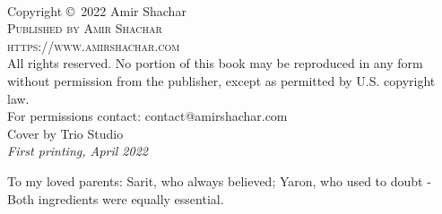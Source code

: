 \documentclass[11pt]{book}
\begin{document}

\begingroup
\thispagestyle{empty} %
\vfill
\endgroup


\newpage
~\vfill
\thispagestyle{empty}

\noindent Copyright \copyright\ 2022 Amir Shachar\\ %

\noindent \textsc{Published by Amir Shachar}\\

\noindent \textsc{https://www.amirshachar.com}\\

\noindent All rights reserved. No portion of this book may be reproduced in any form without permission from the publisher, except as permitted by U.S. copyright law.\\

\noindent For permissions contact: contact@amirshachar.com\\

\noindent Cover by Trio Studio \\

\noindent \textit{First printing, April 2022} %

\clearpage
\begin{center}
    \thispagestyle{empty}
    \vspace*{\fill}
    To my loved parents:\linebreak
Sarit, who always believed;\linebreak
Yaron, who used to doubt -\linebreak
Both ingredients were equally essential.
    \vspace*{\fill}
\end{center}
\clearpage
\end{document}
